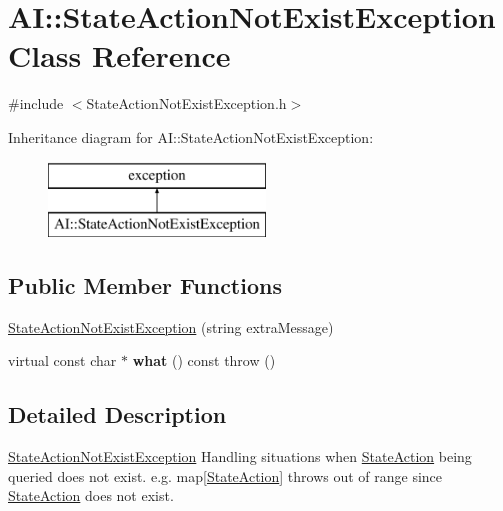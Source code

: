 \hypertarget{classAI_1_1StateActionNotExistException}{\section{A\-I\-:\-:State\-Action\-Not\-Exist\-Exception Class Reference}
\label{classAI_1_1StateActionNotExistException}
}


{\ttfamily \#include $<$State\-Action\-Not\-Exist\-Exception.\-h$>$}

Inheritance diagram for A\-I\-:\-:State\-Action\-Not\-Exist\-Exception\-:\begin{figure}[H]
\begin{center}
\leavevmode
\includegraphics[height=2.000000cm]{classAI_1_1StateActionNotExistException}
\end{center}
\end{figure}
\subsection*{Public Member Functions}
\begin{DoxyCompactItemize}
\item 
\hyperlink{classAI_1_1StateActionNotExistException_abcba2ae2e7a93a728595704c3440e778}{State\-Action\-Not\-Exist\-Exception} (string extra\-Message)
\item 
\hypertarget{classAI_1_1StateActionNotExistException_a787f165434d1a3d4d9c7e5f9a3fa302a}{virtual const char $\ast$ {\bfseries what} () const   throw ()}\label{classAI_1_1StateActionNotExistException_a787f165434d1a3d4d9c7e5f9a3fa302a}

\end{DoxyCompactItemize}


\subsection{Detailed Description}
\hyperlink{classAI_1_1StateActionNotExistException}{State\-Action\-Not\-Exist\-Exception} Handling situations when \hyperlink{classAI_1_1StateAction}{State\-Action} being queried does not exist. e.\-g. map\mbox{[}\hyperlink{classAI_1_1StateAction}{State\-Action}\mbox{]} throws out of range since \hyperlink{classAI_1_1StateAction}{State\-Action} does not exist. 

